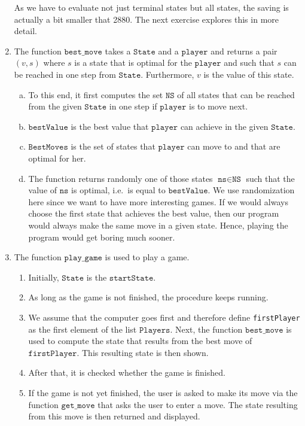 \begin{enumerate}
      As we have to evaluate not just terminal states but all states, the saving is actually a bit smaller that
      2880.  The next exercise explores this in more detail.
\item The function $\texttt{best\_move}$ takes a $\texttt{State}$ and a $\texttt{player}$ and returns a pair $(v,s)$
      where $s$ is a state that is optimal for the $\texttt{player}$ and such that $s$ can be reached in one step from
      $\texttt{State}$.  Furthermore, $v$ is the value of this state.
      \begin{enumerate}[(a)]
      \item To this end, it first computes the set $\texttt{NS}$ of all states that can be reached 
            from the given $\texttt{State}$ in one step if $\texttt{player}$ is to move next.
      \item $\texttt{bestValue}$ is the best value that $\texttt{player}$ can achieve in the given $\texttt{State}$.
      \item $\texttt{BestMoves}$ is the set of states that  $\texttt{player}$ can move to and that are optimal
            for her.
      \item The function returns randomly one of those states $\texttt{ns} \in \texttt{NS}$ such that 
            the value of $\texttt{ns}$ is optimal, i.e.~is equal to $\texttt{bestValue}$.
            We use randomization here since we want to have more interesting games.  If we would always choose
            the first state that achieves the best value, then our program would always make the same move in
            a given state.  Hence, playing the program would get boring much sooner.
      \end{enumerate}
\item The function $\texttt{play\_game}$ is used to play a game.
      \begin{enumerate}
      \item Initially, $\texttt{State}$ is the $\texttt{startState}$.
      \item As long as the game is not finished, the procedure keeps running.
      \item We assume that the computer goes first and therefore define  \texttt{firstPlayer} as the first
            element of the list $\texttt{Players}$.  Next, the function $\texttt{best\_move}$ is used to
            compute the state that results from the best move of $\texttt{firstPlayer}$.
            This resulting state is then shown.
      \item After that, it is checked whether the game is finished.
      \item If the game is not  yet finished, the user is asked to make its move via the function
            $\texttt{get\_move}$ that asks the user to enter a move.
            The state resulting from this move is then returned and displayed.


\end{enumerate}
\end{enumerate}
